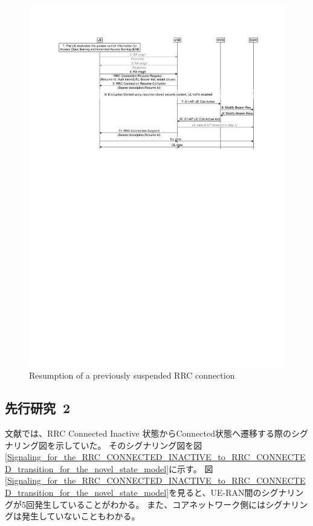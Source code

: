 \documentclass[a4j]{ujarticle}
\begin{document}
\begin{figure}[htbp]
  \centering
  \includegraphics[width=0.9\hsize]{Resumption_of_a_previously_suspended_RRC_connection.pdf}
  \caption{Resumption of a previously suspended RRC connection}
  \label{Resumption_of_a_previously_suspended_RRC_connection}
\end{figure}

\clearpage
\subsection{先行研究~2}
文献\cite{ANovelStateModelfor5GRadioAccessNetworks}では、RRC Connected Inactive 状態からConnected状態へ遷移する際のシグナリング図を示していた。
そのシグナリング図を図\ref{Signaling_for_the_RRC_CONNECTED_INACTIVE_to_RRC_CONNECTED_transition_for_the_novel_state_model}に示す。
図\ref{Signaling_for_the_RRC_CONNECTED_INACTIVE_to_RRC_CONNECTED_transition_for_the_novel_state_model}を見ると、UE-RAN間のシグナリングが5回発生していることがわかる。
また、コアネットワーク側にはシグナリングは発生していないこともわかる。
\end{document}
